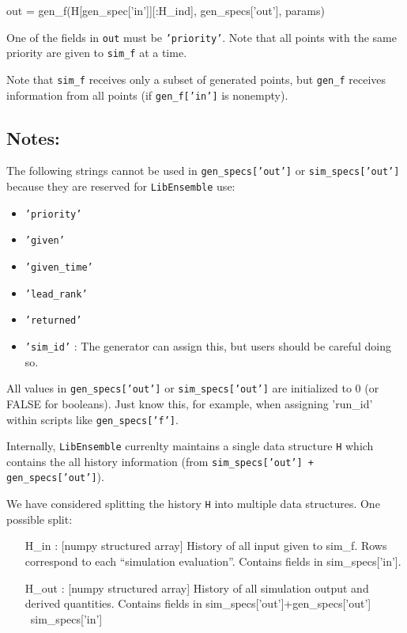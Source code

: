 \documentclass{article}
\newenvironment{allintypewriter}{\ttfamily}{\par}
\newcommand{\libE}{\texttt{LibEnsemble}\xspace}
\begin{document}
\begin{allintypewriter}
  out = gen\_f(H[gen\_spec['in']][:H\_ind], gen\_specs['out'], params)\\
\end{allintypewriter}

One of the fields in \texttt{out} must be \texttt{'priority'}. Note that all
points with the same priority are given to \texttt{sim\_f} at a time.

Note that \texttt{sim\_f} receives only a subset of generated points, but
\texttt{gen\_f} receives information from all points (if \texttt{gen\_f['in']}
is nonempty).

\subsection{Notes:}
The following strings cannot be used in  \texttt{gen\_specs['out']} or
\texttt{sim\_specs['out']} because they are reserved for \libE use:
\begin{itemize}
  \item \texttt{'priority'}
  \item \texttt{'given'}
  \item \texttt{'given\_time'}
  \item \texttt{'lead\_rank'}
  \item \texttt{'returned'}
  \item \texttt{'sim\_id'} : The generator can assign this, but users should be
    careful doing so.
\end{itemize}

All values in \texttt{gen\_specs['out']} or \texttt{sim\_specs['out']} are
initialized to 0 (or FALSE for booleans). Just know this, for example, when
assigning 'run\_id' within scripts like \texttt{gen\_specs['f']}.

Internally, \libE currenlty maintains a single data structure \texttt{H} which
contains the all history information (from \texttt{sim\_specs['out'] +
gen\_specs['out']}). 

We have considered splitting the history \texttt{H} into multiple data structures. One possible split:

\begin{allintypewriter}
  \begin{itemize}
    \item[H\_in]: [numpy structured array] History of all input given to
      sim\_f. Rows correspond to each ``simulation evaluation''. Contains fields
      in sim\_specs['in']. 
      
    \item[H\_out]: [numpy structured array] History of all simulation output
      and derived quantities. Contains fields in sim\_specs['out']+gen\_specs['out'] \ sim\_specs['in']
  \end{itemize}
\end{allintypewriter}
\end{document}
